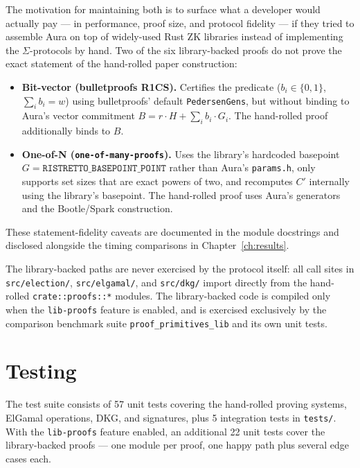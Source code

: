 \documentclass[12pt,a4paper,oneside]{report}
\begin{document}
The motivation for maintaining both is to surface what a developer 
would actually pay --- in performance, proof size, and protocol fidelity 
--- if they tried to assemble Aura on top of widely-used Rust ZK libraries 
instead of implementing the $\Sigma$-protocols by hand. Two of the six 
library-backed proofs do not prove the exact statement of the 
hand-rolled paper construction:

\begin{itemize}
    \item \textbf{Bit-vector (bulletproofs R1CS).} Certifies the predicate 
    ($b_i \in \{0, 1\}$, $\sum_i b_i = w$) using bulletproofs' default 
    \texttt{PedersenGens}, but without binding to Aura's vector commitment 
    $B = r \cdot H + \sum_i b_i \cdot G_i$. The hand-rolled proof 
    additionally binds to $B$.
    \item \textbf{One-of-N (\texttt{one-of-many-proofs}).} Uses the 
    library's hardcoded basepoint $G = \texttt{RISTRETTO\_BASEPOINT\_POINT}$ 
    rather than Aura's \texttt{params.h}, only supports set sizes that 
    are exact powers of two, and recomputes $C'$ internally using the 
    library's basepoint. The hand-rolled proof uses Aura's generators 
    and the Bootle/Spark construction.
\end{itemize}

These statement-fidelity caveats are documented in the module docstrings 
and disclosed alongside the timing comparisons in Chapter~\ref{ch:results}.

The library-backed paths are never exercised by the protocol itself: 
all call sites in \texttt{src/election/}, \texttt{src/elgamal/}, and 
\texttt{src/dkg/} import directly from the hand-rolled \texttt{crate::proofs::*} 
modules. The library-backed code is compiled only when the 
\texttt{lib-proofs} feature is enabled, and is exercised exclusively 
by the comparison benchmark suite \texttt{proof\_primitives\_lib} and 
its own unit tests.

\section{Testing}
\label{sec:impl-testing}

The test suite consists of 57 unit tests covering the hand-rolled 
proving systems, ElGamal operations, DKG, and signatures, plus 5 
integration tests in \texttt{tests/}. With the \texttt{lib-proofs} 
feature enabled, an additional 22 unit tests cover the library-backed 
proofs --- one module per proof, one happy path plus several edge cases 
each.
\end{document}
